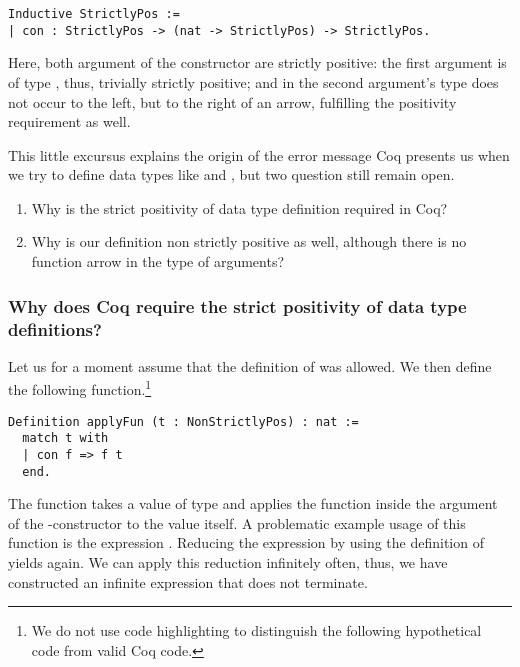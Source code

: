 \begin{verbatim}
Inductive StrictlyPos :=
| con : StrictlyPos -> (nat -> StrictlyPos) -> StrictlyPos.
\end{verbatim}

Here, both argument of the constructor  are strictly positive: the first argument is of type , thus, trivially strictly positive; and in the second argument's type  does not occur to the left, but to the right of an arrow, fulfilling the positivity requirement as well.

This little excursus explains the origin of the error message Coq presents us when we try to define data types like  and , but two question still remain open.

\begin{enumerate}
\item Why is the strict positivity of data type definition required in Coq?
\item Why is our definition  non strictly positive as well, although there is no function arrow in the type of  arguments?
\end{enumerate}

\subsubsection{Why does Coq require the strict positivity of data type definitions?}

Let us for a moment assume that the definition of  was allowed.
We then define the following function.\footnote{We do not use code highlighting to distinguish the following hypothetical code from valid Coq code.}

\begin{verbatim}
Definition applyFun (t : NonStrictlyPos) : nat :=
  match t with
  | con f => f t
  end.
\end{verbatim}

The function  takes a value  of type  and applies the function  inside the
argument of the -constructor to the value  itself.
A problematic example usage of this function is the expression .
Reducing the expression by using the definition of  yields  again.
We can apply this reduction infinitely often, thus, we have constructed an infinite expression that does not terminate.

